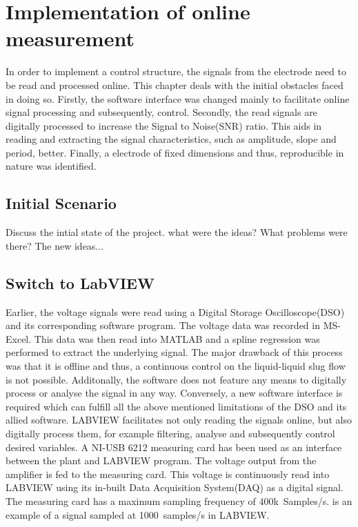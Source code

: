\documentclass[main.tex]{subfiles}
\begin{document}
\chapter[Implementaton of online measurement]{Implementation of online measurement}
%
In order to implement a control structure, the signals from the electrode need to be read and processed online. This chapter deals with the initial obstacles faced in doing so. Firstly, the software interface was changed mainly to facilitate online signal processing and subsequently, control. Secondly, the read signals are digitally processed to increase the Signal to Noise(SNR) ratio. This aids in reading and extracting the signal characteristics, such as amplitude, slope and period, better. Finally, a electrode of fixed dimensions and thus, reproducible in nature was identified. 
%
\section[Initial Scenario]{Initial Scenario}
Discuss the intial state of the project. what were the ideas? What problems were there? The new ideas...
%
\section[Switch to LabVIEW]{Switch to LabVIEW}
Earlier, the voltage signals were read using a Digital Storage Oscilloscope(DSO) and its corresponding software program. The voltage data was recorded in MS-Excel. This data was then read into MATLAB and a spline regression was performed to extract the underlying signal. The major drawback of this process was that it is offline and thus, a continuous control on the liquid-liquid slug flow is not possible. Additonally, the software does not feature any means to digitally process or analyse the signal in any way. Conversely, a new software interface is required which can fulfill all the above mentioned limitations of the DSO and its allied software.
%
LABVIEW facilitates not only reading the signals online, but also digitally process them, for example filtering, analyse and subsequently control desired variables. A NI-USB 6212 measuring card has been used as an interface between the plant and LABVIEW program. 	The voltage output from the amplifier is fed to the measuring card. This voltage is continuously read into LABVIEW using its in-built Data Acquisition System(DAQ) as a digital signal. The measuring card has a maximum sampling frequency of 400k~Samples/s.   is an example of a signal sampled at 1000~samples/s in LABVIEW.
%
\end{document}
